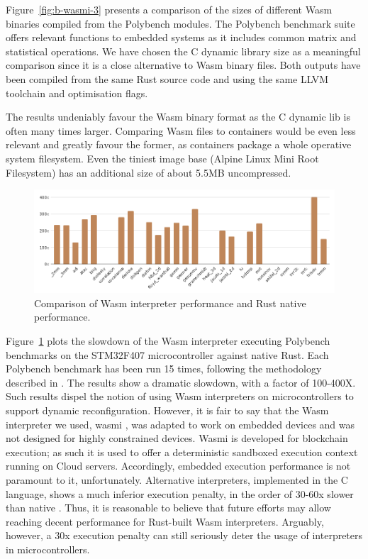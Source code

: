 Figure~\ref{fig:b-wasmi-3} presents a comparison of the sizes of different Wasm binaries compiled from the Polybench \cite{yuki2014understanding} modules. The Polybench benchmark suite offers relevant functions to embedded systems as it includes common matrix and statistical operations. We have chosen the C dynamic library size as a meaningful comparison since it is a close alternative to Wasm binary files. Both outputs have been compiled from the same Rust source code and using the same LLVM toolchain and optimisation flags.

The results undeniably favour the Wasm binary format as the C dynamic lib is often many times larger. Comparing Wasm files to containers would be even less relevant and greatly favour the former, as containers package a whole operative system filesystem. Even the tiniest image base (Alpine Linux Mini Root Filesystem) has an additional size of about 5.5MB uncompressed.

\begin{figure}[ht]
\centering
\includegraphics[width=\columnwidth]{figures/b-wasmi-4}
\caption{Comparison of Wasm interpreter performance and Rust native performance.} \label{fig:b-wasmi-4}
\end{figure}

Figure~\ref{fig:b-wasmi-4} plots the slowdown of the Wasm interpreter executing Polybench benchmarks on the STM32F407 microcontroller against native Rust. 
Each Polybench benchmark has been run 15 times, following the methodology described in \cite{wasm3-performance}. The results show a dramatic slowdown, with a factor of 100-400X. Such results dispel the notion of using Wasm interpreters on microcontrollers to support dynamic reconfiguration.
However, it is fair to say that the Wasm interpreter we used, wasmi \cite{wasmi}, was adapted to work on embedded devices and was not designed for highly constrained devices. 
Wasmi is developed for blockchain execution; as such it is used to offer a deterministic sandboxed execution context running on Cloud servers. Accordingly, embedded execution performance is not paramount to it, unfortunately. Alternative interpreters, implemented in the C language, shows a much inferior  execution penalty, in the order of 30-60x slower than native \cite{peach2020ewasm}. Thus, it is reasonable to believe that future efforts may allow reaching decent performance for Rust-built Wasm interpreters. Arguably, however, a 30x execution penalty can still seriously deter the usage of interpreters in microcontrollers.

